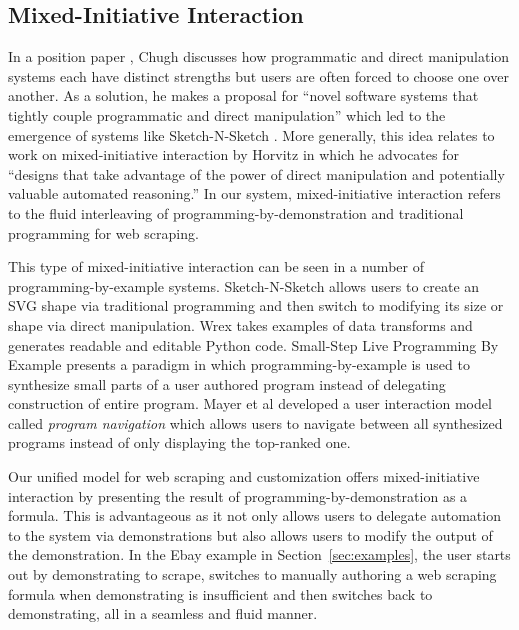 \documentclass[sigconf,10pt]{acmart}
\begin{document}
\hypertarget{mixed-initiative-interaction}{%
\subsection{Mixed-Initiative
Interaction}\label{mixed-initiative-interaction}}

In a position paper \citep{chugh2016a}, Chugh discusses how programmatic
and direct manipulation systems each have distinct strengths but users
are often forced to choose one over another. As a solution, he makes a
proposal for ``novel software systems that tightly couple programmatic
and direct manipulation'' which led to the emergence of systems like
Sketch-N-Sketch \citep{chugh2016}. More generally, this idea relates to
work on mixed-initiative interaction by Horvitz \citep{horvitz1999} in
which he advocates for ``designs that take advantage of the power of
direct manipulation and potentially valuable automated reasoning.'' In
our system, mixed-initiative interaction refers to the fluid
interleaving of programming-by-demonstration and traditional programming
for web scraping.

This type of mixed-initiative interaction can be seen in a number of
programming-by-example systems. Sketch-N-Sketch \citep{chugh2016} allows
users to create an SVG shape via traditional programming and then switch
to modifying its size or shape via direct manipulation. Wrex
\citep{drosos2020} takes examples of data transforms and generates
readable and editable Python code. Small-Step Live Programming By
Example \citep{ferdowsifard2020} presents a paradigm in which
programming-by-example is used to synthesize small parts of a user
authored program instead of delegating construction of entire program.
Mayer et al \citep{mayer2015} developed a user interaction model called
\emph{program navigation} which allows users to navigate between all
synthesized programs instead of only displaying the top-ranked one.

Our unified model for web scraping and customization offers
mixed-initiative interaction by presenting the result of
programming-by-demonstration as a formula. This is advantageous as it
not only allows users to delegate automation to the system via
demonstrations but also allows users to modify the output of the
demonstration. In the Ebay example in Section~\ref{sec:examples}, the
user starts out by demonstrating to scrape, switches to manually
authoring a web scraping formula when demonstrating is insufficient and
then switches back to demonstrating, all in a seamless and fluid manner.
\end{document}
